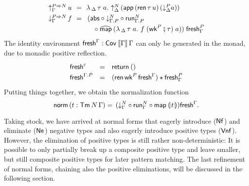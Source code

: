 \documentclass[sigplan,screen,fleqn,review]{acmart} %
\begin{document}
\[
\def\arraystretch{1.3}
\renewcommand{\left}{\,}
\renewcommand{\right}{}
\begin{array}{l@{\,}l@{~~}c@{~~}l}
  \upG {P \To N} & u & = & \lambda
    \, _\Delta
    \, \tau \; a
    . \
    \up[\Delta] N \left( \tapp\,(\tren\,\tau\,u)\,(\down[\Delta] P a) \right)
    \\
  \downG {P \To N} & f & = &
    \left( \tabs
     \comp \down[\cext \Gamma P] N
     \comp \trun^N_{\cext \Gamma P}
\\ &&& \quad {}
     \comp \stmap
      \left(
        \lambda
          \,_\Delta
          \, \tau
          \; a
          . \
          f\; (\twk^P \rcomp \tau)\; a
        \right)
    \right)
    \;\tfresh^P_\Gamma
    \\
\end{array}
\]
The identity environment $\mathsf{fresh}^{\Gamma} : \mathsf{Cov}^{}\,\mathopen{{[\kern-0.14em[}} \Gamma \mathclose{{]\kern-0.14em]}}\,\Gamma$
can only be generated in the monad, due to monadic positive
reflection.
\[
\begin{array}{lcl}
  \idenv{\cempty} & = & \treturn\,() \\
  \idenv{\cext \Gamma P} & = &
    (\tren\,\twk^P\,\idenv\Gamma) \star \tfresh^P_\Gamma \\
\end{array}
\]
Putting things together, we obtain the normalization function
\[
  \tnorm\,(t : \Tm N \Gamma) = \left (\downG N
    \comp \trun^N_\Gamma
    \comp \tmap\,\denty t\right) \idenv\Gamma
.
\]

Taking stock, we have arrived at normal forms that eagerly introduce
($\mathsf{Nf}$) and eliminate ($\mathsf{Ne}^{}$) negative types and also eagerly
introduce positive types ($\mathsf{Vnf}$).  However, the elimination of
positive types is still rather non-deterministic:
It is possible to only partially break up a composite positive type
and leave smaller, but still composite positive types for later
pattern matching.
The last refinement of normal forms,
chaining also the positive eliminations, will be
discussed in the following section.
\end{document}
